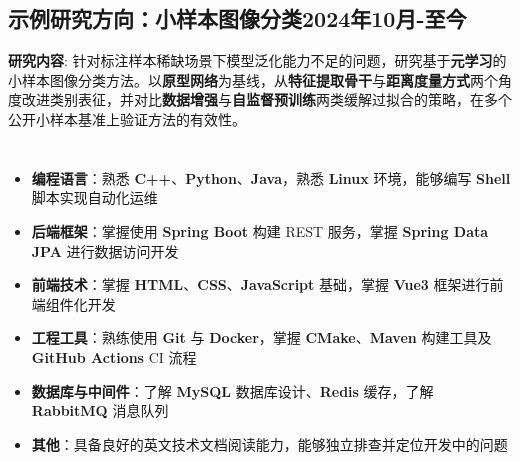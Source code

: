 \documentclass{customResume}
\begin{document}
\subsection{\texorpdfstring{示例研究方向：小样本图像分类\hfill \textnormal{2024年10月-至今}}{示例研究方向}}
\textbf{研究内容}: 针对标注样本稀缺场景下模型泛化能力不足的问题，研究基于\textbf{元学习}的小样本图像分类方法。以\textbf{原型网络}为基线，从\textbf{特征提取骨干}与\textbf{距离度量方式}两个角度改进类别表征，并对比\textbf{数据增强}与\textbf{自监督预训练}两类缓解过拟合的策略，在多个公开小样本基准上验证方法的有效性。

\section{}
\begin{itemize}
    \item \textbf{编程语言}：熟悉 \textbf{C++}、\textbf{Python}、\textbf{Java}，熟悉 \textbf{Linux} 环境，能够编写 \textbf{Shell} 脚本实现自动化运维
    \item \textbf{后端框架}：掌握使用 \textbf{Spring Boot} 构建 REST 服务，掌握 \textbf{Spring Data JPA} 进行数据访问开发
    \item \textbf{前端技术}：掌握 \textbf{HTML}、\textbf{CSS}、\textbf{JavaScript} 基础，掌握 \textbf{Vue3} 框架进行前端组件化开发
    \item \textbf{工程工具}：熟练使用 \textbf{Git} 与 \textbf{Docker}，掌握 \textbf{CMake}、\textbf{Maven} 构建工具及 \textbf{GitHub Actions} CI 流程
    \item \textbf{数据库与中间件}：了解 \textbf{MySQL} 数据库设计、\textbf{Redis} 缓存，了解 \textbf{RabbitMQ} 消息队列
    \item \textbf{其他}：具备良好的英文技术文档阅读能力，能够独立排查并定位开发中的问题
\end{itemize}


\vfill
\end{document}
